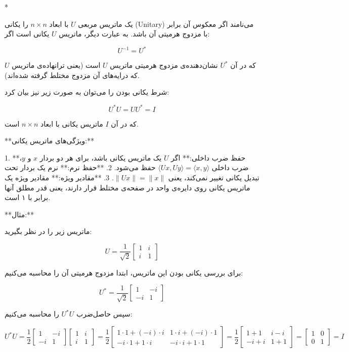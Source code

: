 *\begin{definition}
یک ماتریس مربعی \( U \) با ابعاد \( n \times n \) را یکانی (Unitary) می‌نامند اگر معکوس آن برابر با مزدوج هرمیتی آن باشد. به عبارت دیگر، ماتریس \( U \) یکانی است اگر:

\[
U^{-1} = U^*
\]

که در آن \( U^* \) نشان‌دهنده‌ی مزدوج هرمیتی ماتریس \( U \) است (یعنی ترانهاده‌ی ماتریس \( U \) که درایه‌های آن مزدوج مختلط گرفته شده‌اند). 

شرط یکانی بودن را می‌توان به صورت زیر نیز بیان کرد:

\[
U^* U = U U^* = I
\]

که در آن \( I \) ماتریس یکانی با ابعاد \( n \times n \) است.
\end{definition}

**ویژگی‌های ماتریس یکانی:**

1. **حفظ ضرب داخلی:** اگر \( U \) یک ماتریس یکانی باشد، برای هر دو بردار \( x \) و \( y \)، ضرب داخلی \( \langle Ux, Uy \rangle = \langle x, y \rangle \) حفظ می‌شود.
2. **حفظ نرم:** نرم یک بردار تحت تبدیل یکانی تغییر نمی‌کند، یعنی \( \|Ux\| = \|x\| \).
3. **مقادیر ویژه:** مقادیر ویژه یک ماتریس یکانی روی دایره‌ی واحد در صفحه‌ی مختلط قرار دارند، یعنی قدر مطلق آنها برابر با ۱ است.

**مثال:**

ماتریس زیر را در نظر بگیرید:

\[
U = \frac{1}{\sqrt{2}} \begin{bmatrix}
	1 & i \\
	i & 1
\end{bmatrix}
\]

برای بررسی یکانی بودن این ماتریس، ابتدا مزدوج هرمیتی آن را محاسبه می‌کنیم:

\[
U^* = \frac{1}{\sqrt{2}} \begin{bmatrix}
	1 & -i \\
	-i & 1
\end{bmatrix}
\]

سپس حاصل‌ضرب \( U^* U \) را محاسبه می‌کنیم:

\[
U^* U = \frac{1}{2} \begin{bmatrix}
	1 & -i \\
	-i & 1
\end{bmatrix}
\begin{bmatrix}
	1 & i \\
	i & 1
\end{bmatrix}
= \frac{1}{2} \begin{bmatrix}
	1 \cdot 1 + (-i) \cdot i & 1 \cdot i + (-i) \cdot 1 \\
	-i \cdot 1 + 1 \cdot i & -i \cdot i + 1 \cdot 1
\end{bmatrix}
= \frac{1}{2} \begin{bmatrix}
	1 + 1 & i - i \\
	-i + i & 1 + 1
\end{bmatrix}
= \begin{bmatrix}
	1 & 0 \\
	0 & 1
\end{bmatrix}
= I
\]

